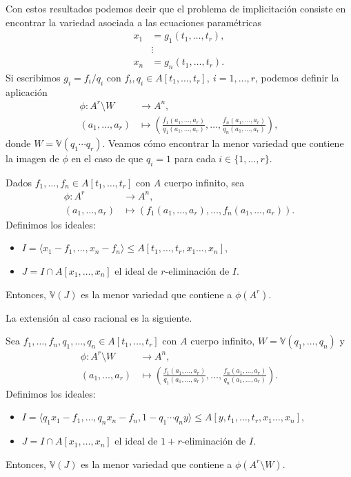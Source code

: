 Con estos resultados podemos decir que el problema de implicitación consiste en encontrar la variedad asociada a las ecuaciones paramétricas
\begin{align}
    x_1 &= g_1(t_1,\dots, t_r),\\
    &\vdots \label{eq:paramEq} \\
    x_n &= g_n(t_1,\dots, t_r).
\end{align}
Si escribimos $g_i = f_i/q_i$ con $f_i,q_i \in A[t_1,\dots, t_r],\ i=1,\dots, r$, podemos definir la aplicación
\begin{align*}
        \phi \colon A^r\setminus W  & \to A^n,\\
        (a_1,\dots, a_r) & \mapsto \left( \frac{f_1(a_1,\dots, a_r)}{q_1(a_1,\dots, a_r)}, \dots, \frac{f_n(a_1,\dots, a_r)}{q_n(a_1,\dots, a_r)}\right),
    \end{align*}
donde $W=\mathbb{V}(q_1\cdots q_r)$. Veamos cómo encontrar la menor variedad que contiene la imagen de $\phi$ en el caso de que $q_i = 1$ para cada $i\in \{1,\dots, r\}$. 
\begin{teorema}
    Dados $f_1,\dots, f_n \in A[t_1, \dots, t_r]$ con $A$ cuerpo infinito, sea
    \begin{align*}
        \phi \colon A^r  & \to A^n,\\
        (a_1,\dots, a_r) & \mapsto \left( f_1(a_1,\dots, a_r), \dots, f_n(a_1,\dots, a_r) \right).
    \end{align*}
    Definimos los ideales:
    \begin{itemize}
        \item $I = \langle x_1-f_1,\dots,  x_n-f_n\rangle \le A[t_1,\dots, t_r,x_1\dots, x_n]$,
        \item $J = I\cap A[x_1,\dots, x_n]$ el ideal de $r$-eliminación de $I$.
    \end{itemize}
    Entonces, $\mathbb{V}(J)$ es la menor variedad que contiene a $\phi(A^r)$.
\end{teorema}


La extensión al caso racional es la siguiente.
\begin{teorema}
    Sea $f_1,\dots, f_n, q_1,\dots, q_n \in A[t_1, \dots, t_r]$ con $A$ cuerpo infinito, $W=\mathbb{V}(q_1,\dots, q_n)$ y
    \begin{align*}
        \phi \colon A^r\setminus W  & \to A^n,\\
        (a_1,\dots, a_r) & \mapsto \left( \frac{f_1(a_1,\dots, a_r)}{q_1(a_1,\dots, a_r)}, \dots, \frac{f_n(a_1,\dots, a_r)}{q_n(a_1,\dots, a_r)}\right).
    \end{align*}
     Definimos los ideales:
    \begin{itemize}
        \item $I = \langle q_1x_1-f_1,\dots,  q_nx_n-f_n, 1-q_1\cdots q_ny\rangle \le A[y,t_1,\dots, t_r,x_1\dots, x_n]$,
        \item $J = I\cap A[x_1,\dots, x_n]$ el ideal de $1+r$-eliminación de $I$.
    \end{itemize}
    Entonces, $\mathbb{V}(J)$ es la menor variedad que contiene a $\phi(A^r\setminus W)$.
\end{teorema}

